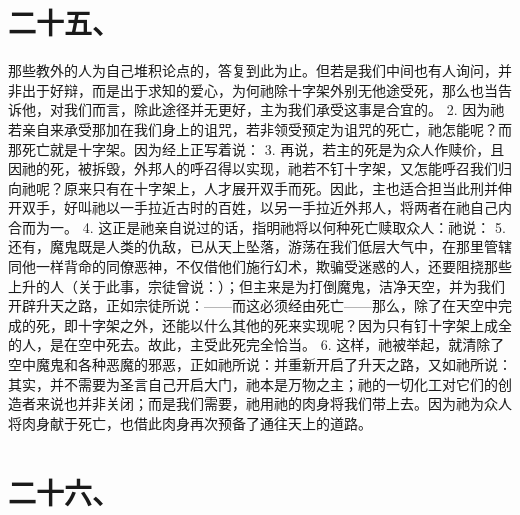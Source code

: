 
\section{二十五、}

那些教外的人为自己堆积论点的，答复到此为止。但若是我们中间也有人询问，并非出于好辩，而是出于求知的爱心，为何祂除十字架外别无他途受死，那么也当告诉他，对我们而言，除此途径并无更好，主为我们承受这事是合宜的。 2. 因为祂若亲自来承受那加在我们身上的诅咒，若非领受预定为诅咒的死亡，祂怎能呢？而那死亡就是十字架。因为经上正写着说： 3. 再说，若主的死是为众人作赎价，且因祂的死，被拆毁，外邦人的呼召得以实现，祂若不钉十字架，又怎能呼召我们归向祂呢？原来只有在十字架上，人才展开双手而死。因此，主也适合担当此刑并伸开双手，好叫祂以一手拉近古时的百姓，以另一手拉近外邦人，将两者在祂自己内合而为一。 4. 这正是祂亲自说过的话，指明祂将以何种死亡赎取众人：祂说： 5. 还有，魔鬼既是人类的仇敌，已从天上坠落，游荡在我们低层大气中，在那里管辖同他一样背命的同僚恶神，不仅借他们施行幻术，欺骗受迷惑的人，还要阻挠那些上升的人（关于此事，宗徒曾说：）；但主来是为打倒魔鬼，洁净天空，并为我们开辟升天之路，正如宗徒所说：——而这必须经由死亡——那么，除了在天空中完成的死，即十字架之外，还能以什么其他的死来实现呢？因为只有钉十字架上成全的人，是在空中死去。故此，主受此死完全恰当。 6. 这样，祂被举起，就清除了空中魔鬼和各种恶魔的邪恶，正如祂所说：并重新开启了升天之路，又如祂所说：其实，并不需要为圣言自己开启大门，祂本是万物之主；祂的一切化工对它们的创造者来说也并非关闭；而是我们需要，祂用祂的肉身将我们带上去。因为祂为众人将肉身献于死亡，也借此肉身再次预备了通往天上的道路。\par


\section{二十六、}


